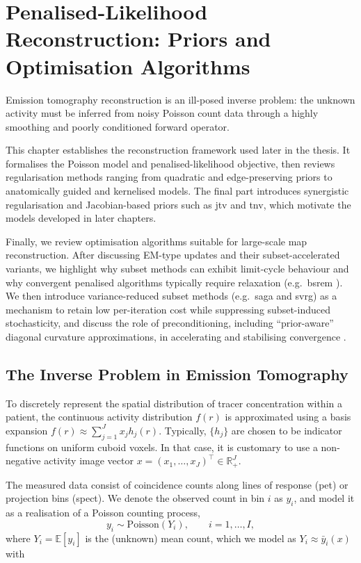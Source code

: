 \chapter{Penalised-Likelihood Reconstruction: Priors and Optimisation Algorithms}
\label{chapter:reconstruction}

Emission tomography reconstruction is an ill-posed inverse problem: the unknown activity must be inferred from noisy Poisson count data through a highly smoothing and poorly conditioned forward operator.

This chapter establishes the reconstruction framework used later in the thesis. It formalises the Poisson model and penalised-likelihood objective, then reviews regularisation methods ranging from quadratic and edge-preserving priors to anatomically guided and kernelised models. The final part introduces synergistic regularisation and Jacobian-based priors such as \acrfull{jtv} and \acrfull{tnv}, which motivate the models developed in later chapters.

Finally, we review optimisation algorithms suitable for large-scale \gls{map} reconstruction. After discussing EM-type updates and their subset-accelerated variants, we highlight why subset methods can exhibit limit-cycle behaviour and why convergent penalised algorithms typically require relaxation (e.g.\ \acrfull{bsrem} \cite{ahn_globally_2003}). We then introduce variance-reduced subset methods (e.g.\ \acrfull{saga} and \acrfull{svrg}) as a mechanism to retain low per-iteration cost while suppressing subset-induced stochasticity, and discuss the role of preconditioning, including ``prior-aware'' diagonal curvature approximations, in accelerating and stabilising convergence \cite{ehrhardtFastPETReconstruction2025a, twyman_investigation_2023}.


\section{The Inverse Problem in Emission Tomography}
\label{sec:recon_basics}

To discretely represent the spatial distribution of tracer concentration within a patient, the continuous activity distribution $f(r)$ is approximated using a basis expansion $f(r) \approx \sum_{j=1}^J x_j h_j(r)$. Typically, $\{h_j\}$ are chosen to be indicator functions on uniform cuboid voxels. In that case, it is customary to use a non-negative activity image vector $x = (x_1,\dots,x_J)^\top \in \mathbb{R}_+^{J}$.

The measured data consist of coincidence counts along lines of response (\gls{pet}) or projection bins (\gls{spect}). We denote the observed count in bin $i$ as $y_i$, and model it as a realisation of a Poisson counting process,
\begin{equation}
    y_i \sim \mathrm{Poisson}(Y_i),
    \qquad i=1,\dots,I,
\end{equation}
\noindent
where $Y_i=\mathbb E[y_i]$ is the (unknown) mean count, which we model as $Y_i \approx \bar y_i(x)$ with

